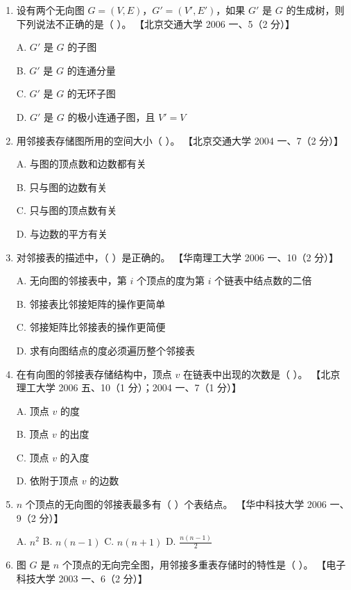\documentclass[lang=cn,newtx,10pt,scheme=chinese]{elegantbook}
\begin{document}
\begin{enumerate}
        \item 设有两个无向图 $G = (V, E)$，$G' = (V', E')$，如果 $G'$ 是 $G$ 的生成树，则下列说法不正确的是（ ）。  
        【北京交通大学 2006 一、5（2 分）】  

        A. $G'$ 是 $G$ 的子图  

        B. $G'$ 是 $G$ 的连通分量  

        C. $G'$ 是 $G$ 的无环子图  

        D. $G'$ 是 $G$ 的极小连通子图，且 $V' = V$  
    
        \item 用邻接表存储图所用的空间大小（ ）。  
        【北京交通大学 2004 一、7（2 分）】 

        A. 与图的顶点数和边数都有关  

        B. 只与图的边数有关  

        C. 只与图的顶点数有关  

        D. 与边数的平方有关 

        \item 对邻接表的描述中，（ ）是正确的。  
        【华南理工大学 2006 一、10（2 分）】  

        A. 无向图的邻接表中，第 $i$ 个顶点的度为第 $i$ 个链表中结点数的二倍  

        B. 邻接表比邻接矩阵的操作更简单  

        C. 邻接矩阵比邻接表的操作更简便  

        D. 求有向图结点的度必须遍历整个邻接表  
    
        \item 在有向图的邻接表存储结构中，顶点 $v$ 在链表中出现的次数是（ ）。  
        【北京理工大学 2006 五、10（1 分）；2004 一、7（1 分）】  

        A. 顶点 $v$ 的度  

        B. 顶点 $v$ 的出度  

        C. 顶点 $v$ 的入度  

        D. 依附于顶点 $v$ 的边数  
    
        \item $n$ 个顶点的无向图的邻接表最多有（ ）个表结点。  
        【华中科技大学 2006 一、9（2 分）】  

        A. $n^2$ \quad B. $n(n-1)$ \quad C. $n(n+1)$ \quad D. $\frac{n(n-1)}{2}$  
    
        \item 图 $G$ 是 $n$ 个顶点的无向完全图，用邻接多重表存储时的特性是（ ）。  
        【电子科技大学 2003 一、6（2 分）】  


\end{enumerate}
\end{document}
